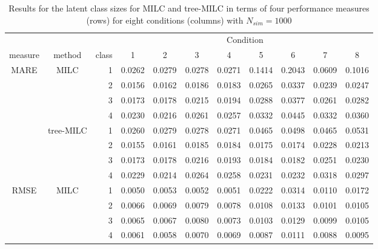 \documentclass[a4paper, 11pt]{article} %
\begin{document}
\begin{table}[h]
\centering
\small
\caption{Results for the latent class sizes for MILC and tree-MILC in terms of four performance measures (rows) for eight conditions (columns) with $N_{sim}=1000$}
\label{A_Table_Prop}
\begin{tabular}{cc
r cccccccc}
  \hline
  &&& \multicolumn{8}{c}{Condition}\\
 measure& method & class & 1 & 2 & 3 & 4 & 5 & 6 & 7 & 8 \\ 
  \hline
  \multirow{8}{*}{MARE}
   & \multirow{4}{*}{MILC}
   &1 & 0.0262 & 0.0279 & 0.0278 & 0.0271 & 0.1414 & 0.2043 & 0.0609 & 0.1016 \\ 
 && 2 & 0.0156 & 0.0162 & 0.0186 & 0.0183 & 0.0265 & 0.0337 & 0.0239 & 0.0247 \\ 
  &&3 & 0.0173 & 0.0178 & 0.0215 & 0.0194 & 0.0288 & 0.0377 & 0.0261 & 0.0282 \\ 
 && 4 & 0.0230 & 0.0216 & 0.0261 & 0.0257 & 0.0332 & 0.0445 & 0.0332 & 0.0360 \\ 
\cline{2-11}
   &\multirow{4}{*}{tree-MILC}
    &1& 0.0260 & 0.0279 & 0.0278 & 0.0271 & 0.0465 & 0.0498 & 0.0465 & 0.0531 \\ 
  &&2 & 0.0155 & 0.0161 & 0.0185 & 0.0184 & 0.0175 & 0.0174 & 0.0228 & 0.0213 \\ 
  &&3 & 0.0173 & 0.0178 & 0.0216 & 0.0193 & 0.0184 & 0.0182 & 0.0251 & 0.0230 \\ 
  &&4 & 0.0229 & 0.0214 & 0.0264 & 0.0258 & 0.0231 & 0.0232 & 0.0318 & 0.0297 \\ 
    \hline
    \hline
  \multirow{8}{*}{RMSE}
   & \multirow{4}{*}{MILC}
  &1 & 0.0050 & 0.0053 & 0.0052 & 0.0051 & 0.0222 & 0.0314 & 0.0110 & 0.0172 \\ 
  &&2 & 0.0066 & 0.0069 & 0.0079 & 0.0078 & 0.0108 & 0.0133 & 0.0101 & 0.0105 \\ 
  &&3 & 0.0065 & 0.0067 & 0.0080 & 0.0073 & 0.0103 & 0.0129 & 0.0099 & 0.0105 \\ 
  &&4 & 0.0061 & 0.0058 & 0.0070 & 0.0069 & 0.0087 & 0.0111 & 0.0088 & 0.0095 \\ 


\end{tabular}
\end{table}
\end{document}
